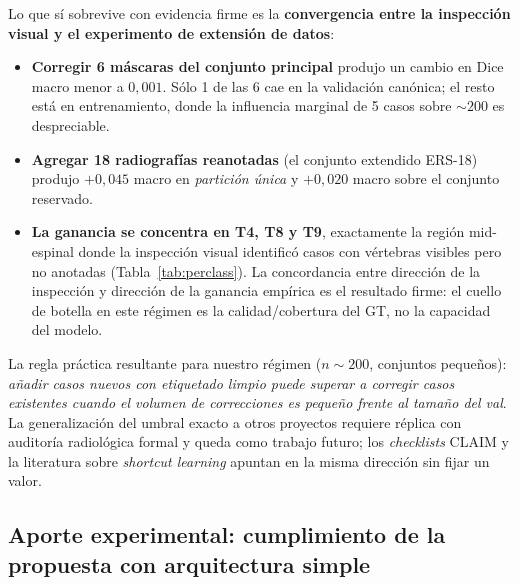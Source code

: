 \documentclass[conference]{IEEEtran}
\begin{document}
Lo que sí sobrevive con evidencia firme es la \textbf{convergencia entre la inspección visual y el experimento de extensión de datos}:

\begin{itemize}
\item \textbf{Corregir 6 máscaras del conjunto principal} produjo un cambio en Dice macro menor a $0{,}001$. Sólo 1 de las 6 cae en la validación canónica; el resto está en entrenamiento, donde la influencia marginal de 5 casos sobre $\sim 200$ es despreciable.
\item \textbf{Agregar 18 radiografías reanotadas} (el conjunto extendido ERS-18) produjo $+0{,}045$ macro en \emph{partición única} y $+0{,}020$ macro sobre el conjunto reservado.
\item \textbf{La ganancia se concentra en T4, T8 y T9}, exactamente la región mid-espinal donde la inspección visual identificó casos con vértebras visibles pero no anotadas (Tabla~\ref{tab:perclass}). La concordancia entre dirección de la inspección y dirección de la ganancia empírica es el resultado firme: el cuello de botella en este régimen es la calidad/cobertura del GT, no la capacidad del modelo.
\end{itemize}

La regla práctica resultante para nuestro régimen ($n \sim 200$, conjuntos pequeños): \emph{añadir casos nuevos con etiquetado limpio puede superar a corregir casos existentes cuando el volumen de correcciones es pequeño frente al tamaño del val}. La generalización del umbral exacto a otros proyectos requiere réplica con auditoría radiológica formal y queda como trabajo futuro; los \emph{checklists} CLAIM \cite{claim} y la literatura sobre \emph{shortcut learning} \cite{shortcut} apuntan en la misma dirección sin fijar un valor.

\subsection{Aporte experimental: cumplimiento de la propuesta con arquitectura simple}
\end{document}
